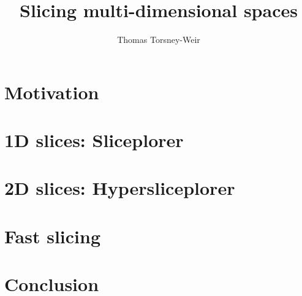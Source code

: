 \documentclass[a4paper,12pt]{article}
\title{Slicing multi-dimensional spaces}
\author{Thomas Torsney-Weir}
\date{}
\begin{document}

\nobibliography*

\maketitle


\section{Motivation}

\section{1D slices: Sliceplorer}

\section{2D slices: Hypersliceplorer}

\section{Fast slicing}

\section{Conclusion}






\cleardoublepage

\end{document}
